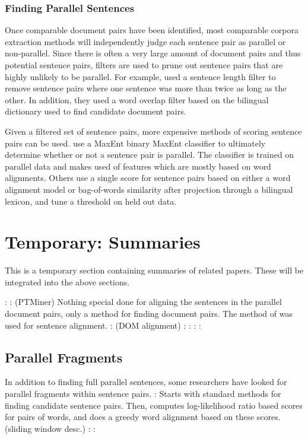 \subsubsection{Finding Parallel Sentences}
Once comparable document pairs have been identified, most comparable corpora
extraction methods will independently judge each sentence pair as parallel or
non-parallel. Since there is often a very large amount of document pairs and
thus potential sentence pairs, filters are used to prune out sentence pairs that
are highly unlikely to be parallel. For example, \citet{Munteanu05} used a
sentence length filter to remove sentence pairs where one sentence was more than
twice as long as the other. In addition, they used a word overlap filter based
on the bilingual dictionary used to find candidate document pairs.

Given a filtered set of sentence pairs, more expensive methods of scoring
sentence pairs can be used. \citet{Munteanu05} use a MaxEnt binary MaxEnt
classifier to ultimately determine whether or not a sentence pair is parallel.
The classifier is trained on parallel data and makes used of features which are
mostly based on word alignments. Others
\cite{Fung04a,Fung04b,Tillmann09a,Tillmann09b} use a single score for sentence
pairs based on either a word alignment model or bag-of-words similarity after
projection through a bilingual lexicon, and tune a threshold on held out data.

\section{Temporary: Summaries}
This is a temporary section containing summaries of related papers. These will
be integrated into the above sections.

\citet{Dagan93}:
\citet{Chen00}: (PTMiner) Nothing special done for aligning the sentences in the 
parallel document pairs, only a method for finding document pairs. The method of
\citet{Simard93} was used for sentence alignment.
\citet{Shi06}: (DOM alignment)
\citet{Abdul-Rauf09}:
\citet{Ambati10}:
\citet{Ture11}:
\citet{Ture12}:

\subsection{Parallel Fragments}
In addition to finding full parallel sentences, some researchers have looked for
parallel fragments within sentence pairs.
\citet{Munteanu06}: Starts with standard methods for finding candidate sentence
pairs. Then, computes log-likelihood ratio based scores for pairs of words, and
does a greedy word alignment based on these scores. (sliding window desc.)
\citet{Quirk07}:
\citet{Riesa12}:

